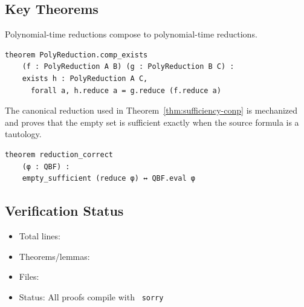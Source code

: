 \subsection{Key Theorems}

\begin{theorem}\label{thm:poly-compose}
Polynomial-time reductions compose to polynomial-time reductions.
\end{theorem}

\begin{verbatim}
theorem PolyReduction.comp_exists
    (f : PolyReduction A B) (g : PolyReduction B C) :
    exists h : PolyReduction A C,
      forall a, h.reduce a = g.reduce (f.reduce a)
\end{verbatim}

\begin{theorem}
The canonical reduction used in Theorem~\ref{thm:sufficiency-conp} is mechanized and proves that the empty set is sufficient exactly when the source formula is a tautology.
\end{theorem}

\begin{verbatim}
theorem reduction_correct
    (φ : QBF) :
    empty_sufficient (reduce φ) ↔ QBF.eval φ
\end{verbatim}

\subsection{Verification Status}

\begin{itemize}
\item Total lines: \LeanTotalLines
\item Theorems/lemmas: \LeanTotalTheorems
\item Files: \LeanTotalFiles
\item Status: All proofs compile with \LeanTotalSorry\ \texttt{sorry}
\end{itemize}
